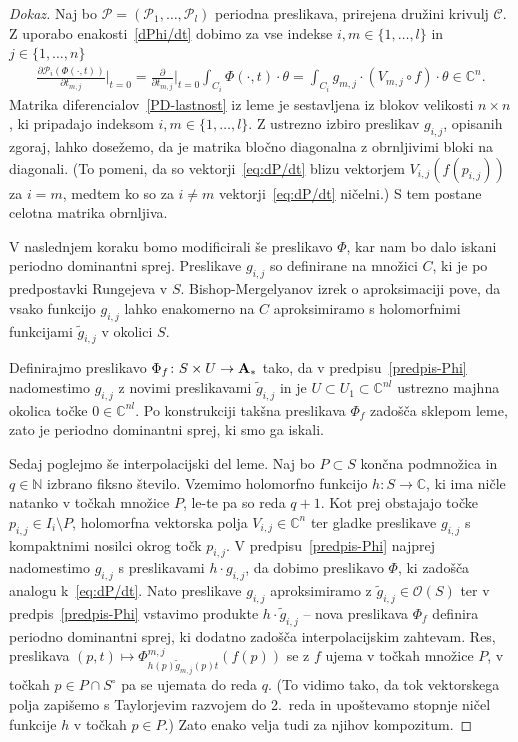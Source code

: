 \documentclass[12pt,a4paper,twoside]{article}
\theoremstyle{definition} %
\newenvironment{dokaz}[1][Dokaz]{\begin{proof}[#1]}{\end{proof}}
\theoremstyle{plain} %
\numberwithin{equation}{section}  %
\newcommand{\C}{\mathbb C}
\begin{document}
\begin{dokaz}
Naj bo $\mathcal{P} = (\mathcal{P}_{1}, \dots, \mathcal{P}_{l})$ periodna preslikava, prirejena družini krivulj $\mathcal{C}$. Z uporabo enakosti~\eqref{dPhi/dt} dobimo za vse indekse $i, m \in \{1, \dots, l \}$ in $j \in \{1, \dots, n \}$
\begin{gather} \label{eq:dP/dt}
\frac{\partial \mathcal{P}_{i}(\Phi(\cdot, t))}{\partial t_{m,j}} \Big|_{t=0} = \frac{\partial}{\partial t_{m,j}} \Big|_{t=0} \int_{C_{i}} \Phi(\cdot, t) \cdot \theta = \int_{C_{i}} g_{m,j} \cdot (V_{m,j} \circ f) \cdot \theta \in \C^{n}.
\end{gather}
Matrika diferencialov~\eqref{PD-lastnost} iz leme je sestavljena iz blokov velikosti $n \times n$, ki pripadajo indeksom $i, m \in \{1, \dots, l \}$. Z ustrezno izbiro preslikav $g_{i,j}$, opisanih zgoraj, lahko dosežemo, da je matrika bločno diagonalna z obrnljivimi bloki na diagonali. (To pomeni, da so vektorji~\eqref{eq:dP/dt} blizu vektorjem $V_{i,j}(f(p_{i,j}))$ za $i = m$, medtem ko so za $i \neq m$ vektorji~\eqref{eq:dP/dt} ničelni.) S tem postane celotna matrika obrnljiva.

V naslednjem koraku bomo modificirali še preslikavo $\Phi$, kar nam bo dalo iskani periodno dominantni sprej.
Preslikave $g_{i,j}$ so definirane na množici $C$, ki je po predpostavki Rungejeva v $S$. Bishop-Mergelyanov izrek o aproksimaciji pove, da vsako funkcijo $g_{i,j}$ lahko enakomerno na $C$ aproksimiramo s holomorfnimi funkcijami $\tilde{g}_{i,j}$ v okolici $S$.

Definirajmo preslikavo $\Phi_{f} \colon S \times U \to \textbf{\textup{A}}_{*}$ tako, da v predpisu~\eqref{predpis-Phi} nadomestimo $g_{i,j}$ z novimi preslikavami $\tilde{g}_{i,j}$ in je $U \subset U_{1} \subset \C^{nl}$ ustrezno majhna okolica točke $0 \in \mathbb{C}^{nl}$. Po konstrukciji takšna preslikava $\Phi_{f}$ zadošča sklepom leme, zato je periodno dominantni sprej, ki smo ga iskali.

Sedaj poglejmo še interpolacijski del leme. Naj bo $P \subset S$ končna podmnožica in $q \in \mathbb{N}$ izbrano fiksno število. Vzemimo holomorfno funkcijo $h \colon S \to \mathbb{C}$, ki ima ničle natanko v točkah množice $P$, le-te pa so reda $q+1$. Kot prej obstajajo točke $p_{i,j} \in I_{i} \setminus P$, holomorfna vektorska polja $V_{i,j} \in \mathbb{C}^{n}$ ter gladke preslikave $g_{i,j}$ s kompaktnimi nosilci okrog točk $p_{i,j}$. V predpisu~\eqref{predpis-Phi} najprej nadomestimo $g_{i,j}$ s preslikavami $h \cdot g_{i,j}$, da dobimo preslikavo $\Phi$, ki zadošča analogu k~\eqref{eq:dP/dt}. Nato preslikave $g_{i,j}$ aproksimiramo z $\tilde{g}_{i,j} \in \mathcal{O}(S)$ ter v predpis~\eqref{predpis-Phi} vstavimo produkte $h \cdot \tilde{g}_{i,j}$ -- nova preslikava $\Phi_{f}$ definira periodno dominantni sprej, ki dodatno zadošča interpolacijskim zahtevam.
Res, preslikava $(p,t) \mapsto \Phi_{h(p) \tilde{g}_{m,j}(p) t}^{m,j} (f(p))$ se z $f$ ujema v točkah množice $P$, v točkah $p \in P \cap S^{\circ}$ pa se ujemata do reda $q$. (To vidimo tako, da tok vektorskega polja zapišemo s Taylorjevim razvojem do 2.~reda in upoštevamo stopnje ničel funkcije $h$ v točkah $p \in P$.) Zato enako velja tudi za njihov kompozitum.


\end{dokaz}
\end{document}
